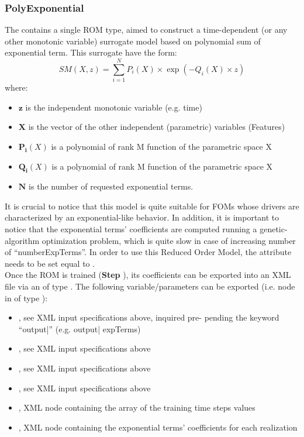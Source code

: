 \subsubsection{PolyExponential}
  The  contains a single ROM type, aimed to construct a     time-dependent
  (or any other monotonic variable) surrogate model based on polynomial sum of exponential term.
  This surrogate have the form:     \begin{equation}       SM(X,z) = \sum_{i=1}^{N} P_{i}(X) \times
  \exp ( - Q_{i}(X) \times z )     \end{equation}     where:     \begin{itemize}       \item
  $\mathbf{z}$ is the independent  monotonic variable (e.g. time)       \item $\mathbf{X}$  is the
  vector of the other independent (parametric) variables  (Features)       \item $\mathbf{P_{i}}(X)$
  is a polynomial of rank M function of the parametric space X       \item  $\mathbf{Q_{i}}(X)$ is a
  polynomial of rank M function of the parametric space X       \item  $\mathbf{N}$ is the number of
  requested exponential terms.     \end{itemize}     It is crucial to notice that this model is
  quite suitable for FOMs whose drivers are characterized by an exponential-like behavior.     In
  addition, it is important to notice that the exponential terms' coefficients are computed running
  a genetic-algorithm optimization     problem, which is quite slow in case of increasing number of
  ``numberExpTerms''.     In order to use this Reduced Order Model, the  attribute
   needs to be set equal to .     \\     Once the ROM is
  trained (\textbf{Step} ), its coefficients can be exported into an XML file
  via an  of type . The following variable/parameters can be
  exported (i.e.  node     in  of type ):
  \begin{itemize}       \item {}, see XML input specifications above, inquired pre-
  pending the keyword ``output|'' (e.g. output| expTerms)       \item {}, see
  XML input specifications above       \item {}, see XML input specifications above
  \item {}, see XML input specifications above       \item {}, XML
  node containing the array of the training time steps values       \item {},
  XML node containing the exponential terms' coefficients for each realization     \end{itemize}

